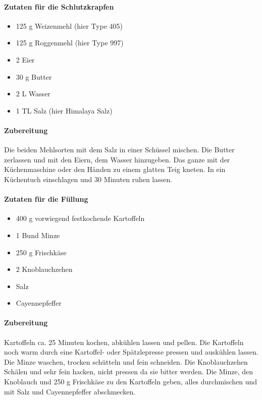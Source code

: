 \paragraph{Zutaten für die Schlutzkrapfen}

\begin{itemize}[noitemsep]
	\item 125 g Weizenmehl (hier Type 405)
	\item 125 g Roggenmehl (hier Type 997)
	\item 2 Eier
	\item 30 g Butter
	\item 2 L Wasser
	\item 1 TL Salz (hier Himalaya Salz)
\end{itemize}

\paragraph{Zubereitung}

Die beiden Mehlsorten mit dem Salz in einer Schüssel mischen. Die Butter zerlassen und mit den Eiern, dem Wasser hinzugeben. Das 
ganze mit der Küchenmaschine oder den Händen zu einem glatten Teig kneten. In ein Küchentuch einschlagen und 30 Minuten ruhen 
lassen.

\paragraph{Zutaten für die Füllung}

\begin{itemize}[noitemsep]
	\item 400 g vorwiegend festkochende Kartoffeln
	\item 1 Bund Minze
	\item 250 g Frischkäse
	\item 2 Knoblauchzehen
	\item Salz
	\item Cayennepfeffer
\end{itemize}

\paragraph{Zubereitung}

Kartoffeln ca. 25 Minuten kochen, abkühlen lassen und pellen. Die Kartoffeln noch warm durch eine Kartoffel- oder Spätzlepresse 
pressen und auskühlen lassen. Die Minze waschen, trocken schütteln und fein schneiden. Die Knoblauchzehen Schälen und sehr fein 
hacken, nicht pressen da sie bitter werden. Die Minze, den Knoblauch und 250 g Frischkäse zu den Kartoffeln geben, alles durchmischen 
und mit Salz und Cayennepfeffer abschmecken.

